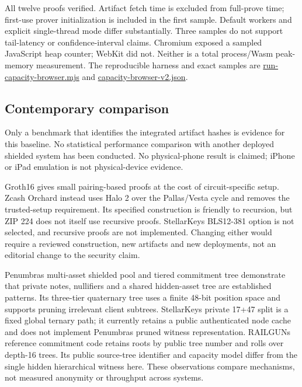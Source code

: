 \documentclass[11pt,letterpaper]{article}
\begin{document}
All twelve proofs verified. Artifact fetch time is excluded from
full-prove time; first-use prover initialization is included in the
first sample. Default workers and explicit single-thread mode differ
substantially. Three samples do not support tail-latency or
confidence-interval claims. Chromium exposed a sampled JavaScript heap
counter; WebKit did not. Neither is a total process/\allowbreak{}Wasm
peak-memory measurement. The reproducible harness and exact samples are
\href{https://github.com/stellarchain/io.stellarkey/blob/v1.1.2/protocol/private-balance/spikes/scripts/run-capacity-browser.mjs}{run-capacity-browser.mjs}
and
\href{https://github.com/stellarchain/io.stellarkey/blob/v1.1.2/protocol/private-balance/results/capacity-browser-v2.json}{capacity-browser-v2.json}.

\subsection{Contemporary comparison}\label{contemporary-comparison}

Only a benchmark that identifies the integrated artifact hashes is
evidence for this baseline. No statistical performance comparison with
another deployed shielded system has been conducted. No physical-phone
result is claimed; iPhone or iPad emulation is not physical-device
evidence.

Groth16 \cite{ref1} gives small pairing-based proofs at the cost of
circuit-specific setup. Zcash Orchard \cite{ref5} instead uses Halo 2
over the Pallas/\allowbreak{}Vesta cycle and removes the trusted-setup
requirement. Its specified construction is friendly to recursion, but
ZIP 224 does not itself use recursive proofs.
StellarKey\textquotesingle s BLS12-381 option is not selected, and
recursive proofs are not implemented. Changing either would require a
reviewed construction, new artifacts and new deployments, not an
editorial change to the security claim.

Penumbra\textquotesingle s multi-asset shielded pool and tiered
commitment tree \cite{ref6} demonstrate that private notes, nullifiers
and a shared hidden-asset tree are established patterns. Its three-tier
quaternary tree uses a finite 48-bit position space and supports pruning
irrelevant client subtrees. StellarKey\textquotesingle s private 17+47
split is a fixed global ternary path; it currently retains a public
authenticated node cache and does not implement
Penumbra\textquotesingle s pruned witness representation.
RAILGUN\textquotesingle s reference commitment code \cite{ref7} retains
roots by public tree number and rolls over depth-16 trees. Its public
source-tree identifier and capacity model differ from the single hidden
hierarchical witness here. These observations compare mechanisms, not
measured anonymity or throughput across systems.
\end{document}

